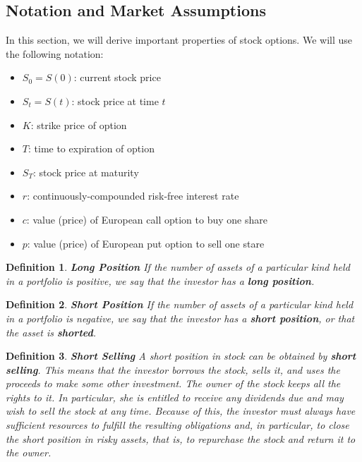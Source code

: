 \documentclass[letterpaper,10pt]{article}
\newtheorem{df}{Definition}[section]
\begin{document}
\subsection{Notation and Market Assumptions}

In this section, we will derive important properties of stock options.  We will use the following notation:

\begin{itemize}

\item $S_0=S(0)$:  current stock price

\item $S_t=S(t)$: stock price at time $t$ 

\item $K$: strike price of option

\item $T$:  time to expiration of option

\item $S_T$:  stock price at maturity

\item $r$:  continuously-compounded risk-free interest rate

\item $c$:  value (price) of European call option to buy one share

\item $p$:  value (price) of European put option to sell one stare

\end{itemize}


\begin{df}{\bf Long Position}
If the number of assets of a particular kind held in a portfolio is positive, we say that the investor has a {\bf long position}.
\end{df}

\begin{df}{\bf Short Position}
If the number of assets of a particular kind held in a portfolio is negative, we say that the investor has a {\bf short position}, or that the asset is {\bf shorted}.
\end{df}

\begin{df}{\bf Short Selling}
A short position in stock can be obtained by {\bf short selling}.  This means that the investor borrows the stock, sells it, and uses the proceeds to make some other investment. The owner of the stock keeps all the rights to it. In particular, she is entitled to receive any dividends due and may wish to sell the stock at any time. Because of this, the investor must always have sufficient resources to fulfill the resulting obligations and, in particular, to close the short position in risky assets, that is, to repurchase the stock and return it to the owner. 
\end{df}
\end{document}
